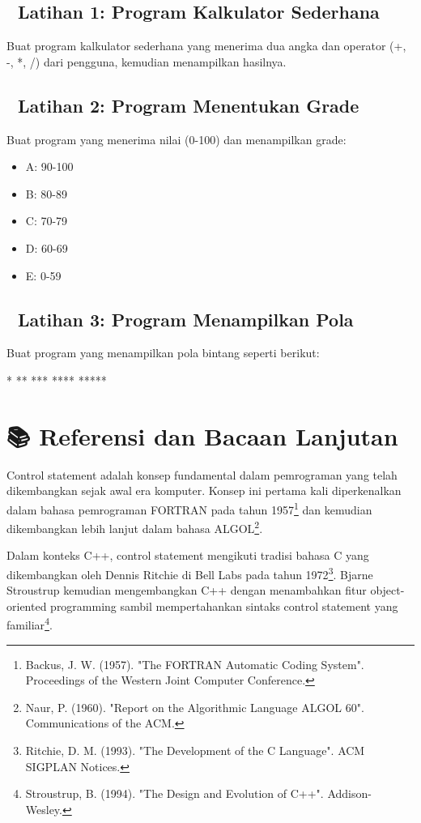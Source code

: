 \subsection{📝 Latihan 1: Program Kalkulator Sederhana}

Buat program kalkulator sederhana yang menerima dua angka dan operator (+, -, *, /) dari pengguna, kemudian menampilkan hasilnya.

\subsection{📝 Latihan 2: Program Menentukan Grade}

Buat program yang menerima nilai (0-100) dan menampilkan grade:
\begin{itemize}
\item A: 90-100
\item B: 80-89
\item C: 70-79
\item D: 60-69
\item E: 0-59
\end{itemize}

\subsection{📝 Latihan 3: Program Menampilkan Pola}

Buat program yang menampilkan pola bintang seperti berikut:
\begin{lcverbatim}
*
**
***
****
*****
\end{lcverbatim}

\section{📚 Referensi dan Bacaan Lanjutan}

Control statement adalah konsep fundamental dalam pemrograman yang telah dikembangkan sejak awal era komputer. Konsep ini pertama kali diperkenalkan dalam bahasa pemrograman FORTRAN pada tahun 1957\footnote{Backus, J. W. (1957). "The FORTRAN Automatic Coding System". Proceedings of the Western Joint Computer Conference.} dan kemudian dikembangkan lebih lanjut dalam bahasa ALGOL\footnote{Naur, P. (1960). "Report on the Algorithmic Language ALGOL 60". Communications of the ACM.}.

Dalam konteks C++, control statement mengikuti tradisi bahasa C yang dikembangkan oleh Dennis Ritchie di Bell Labs pada tahun 1972\footnote{Ritchie, D. M. (1993). "The Development of the C Language". ACM SIGPLAN Notices.}. Bjarne Stroustrup kemudian mengembangkan C++ dengan menambahkan fitur object-oriented programming sambil mempertahankan sintaks control statement yang familiar\footnote{Stroustrup, B. (1994). "The Design and Evolution of C++". Addison-Wesley.}.

